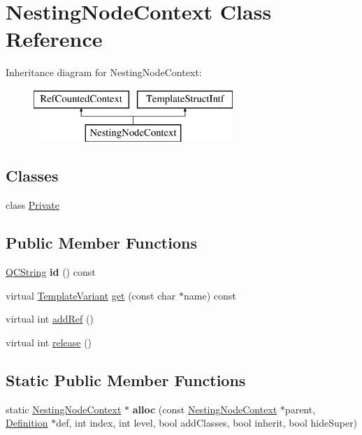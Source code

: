 \hypertarget{class_nesting_node_context}{}\section{Nesting\+Node\+Context Class Reference}
\label{class_nesting_node_context}
Inheritance diagram for Nesting\+Node\+Context\+:\begin{figure}[H]
\begin{center}
\leavevmode
\includegraphics[height=2.000000cm]{class_nesting_node_context}
\end{center}
\end{figure}
\subsection*{Classes}
\begin{DoxyCompactItemize}
\item 
class \mbox{\hyperlink{class_nesting_node_context_1_1_private}{Private}}
\end{DoxyCompactItemize}
\subsection*{Public Member Functions}
\begin{DoxyCompactItemize}
\item 
\mbox{\label{class_nesting_node_context_a232047e13fe2412170b9a803da486752}} 
\mbox{\hyperlink{class_q_c_string}{Q\+C\+String}} {\bfseries id} () const
\item 
virtual \mbox{\hyperlink{class_template_variant}{Template\+Variant}} \mbox{\hyperlink{class_nesting_node_context_a7845a1aab178cdb02172738a864854ce}{get}} (const char $\ast$name) const
\item 
virtual int \mbox{\hyperlink{class_nesting_node_context_a4cd533625e9feace6c41d8191da089c4}{add\+Ref}} ()
\item 
virtual int \mbox{\hyperlink{class_nesting_node_context_a12ca8fb9a771ae6785dcb5bbc305a9ab}{release}} ()
\end{DoxyCompactItemize}
\subsection*{Static Public Member Functions}
\begin{DoxyCompactItemize}
\item 
\mbox{\label{class_nesting_node_context_ab9aa7f792a78cc99248c4b9ebefbdcff}} 
static \mbox{\hyperlink{class_nesting_node_context}{Nesting\+Node\+Context}} $\ast$ {\bfseries alloc} (const \mbox{\hyperlink{class_nesting_node_context}{Nesting\+Node\+Context}} $\ast$parent, \mbox{\hyperlink{class_definition}{Definition}} $\ast$def, int index, int level, bool add\+Classes, bool inherit, bool hide\+Super)
\end{DoxyCompactItemize}


